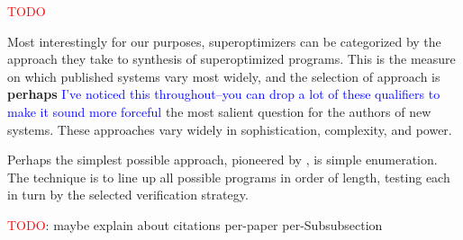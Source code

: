 \documentclass[12pt,twoside]{reedthesis}
\newcommand{\red}[1]{\textcolor{red}{#1}}
\newcommand{\comment}[2]{\textbf{#1} \textcolor{blue}{#2}}
\begin{document}
\red{TODO}

Most interestingly for our purposes, superoptimizers can be categorized by the approach they take to synthesis of superoptimized programs.
This is the measure on which published systems vary most widely, and the selection of approach is \comment{perhaps}{I've noticed this throughout--you can drop a lot of these qualifiers to make it sound more forceful} the most salient question for the authors of new systems.
These approaches vary widely in sophistication, complexity, and power.

Perhaps the simplest possible approach, pioneered by \cite{massalin1987superoptimizer}, is simple enumeration. 
The technique is to line up all possible programs in order of length, testing each in turn by the selected verification strategy. 

\red{TODO}: maybe explain about citations per-paper per-Subsubsection
\end{document}
